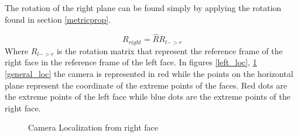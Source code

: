 \documentclass[11pt, oneside]{article}   	%
\begin{document}
The rotation of the right plane can be found simply by applying the rotation found in section \ref{metricprop}.


$$
R_{right} = \hat{R}R_{l->r}
$$
Where $R_{l->r}$ is the rotation matrix that represent the reference frame of the right face in the reference frame of the left face.
In figures \ref{left_loc}, \ref{right_loc} \ref{general_loc} the camera is represented in red while the points on the horizontal plane represent the coordinate of the extreme points of the faces. Red dots are the extreme points of the left face while blue dots are the extreme points of the right face. 

\begin{figure}[H]
 \centering
    \qquad
        \qquad
    \caption{Camera Localization from right face}%
    \label{right_loc}%
\end{figure}
\end{document}
